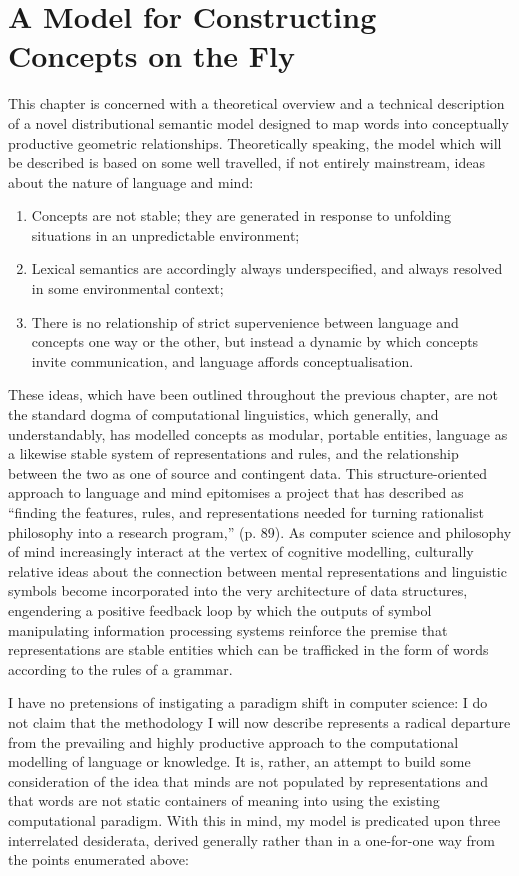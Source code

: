 \chapter{A Model for Constructing Concepts on the Fly} \label{chap:theory}
This chapter is concerned with a theoretical overview and a technical description of a novel distributional semantic model designed to map words into conceptually productive geometric relationships.  Theoretically speaking, the model which will be described is based on some well travelled, if not entirely mainstream, ideas about the nature of language and mind:

\begin{enumerate}
\item{Concepts are not stable; they are generated in response to unfolding situations in an unpredictable environment;}
\item{Lexical semantics are accordingly always underspecified, and always resolved in some environmental context;}
\item{There is no relationship of strict supervenience between language and concepts one way or the other, but instead a dynamic by which concepts invite communication, and language affords conceptualisation.}
\end{enumerate}

These ideas, which have been outlined throughout the previous chapter, are not the standard dogma of computational linguistics, which generally, and understandably, has modelled concepts as modular, portable entities, language as a likewise stable system of representations and rules, and the relationship between the two as one of source and contingent data.  This structure-oriented approach to language and mind epitomises a project that \cite{Dreyfus2012} has described as ``finding the features, rules, and representations needed for turning rationalist philosophy into a research program,'' (p. 89).  As computer science and philosophy of mind increasingly interact at the vertex of cognitive modelling, culturally relative ideas about the connection between mental representations and linguistic symbols become incorporated into the very architecture of data structures, engendering a positive feedback loop by which the outputs of symbol manipulating information processing systems reinforce the premise that representations are stable entities which can be trafficked in the form of words according to the rules of a grammar.

I have no pretensions of instigating a paradigm shift in computer science: I do not claim that the methodology I will now describe represents a radical departure from the prevailing and highly productive approach to the computational modelling of language or knowledge.  It is, rather, an attempt to build some consideration of the idea that minds are not populated by representations and that words are not static containers of meaning into using the existing computational paradigm.  With this in mind, my model is predicated upon three interrelated desiderata, derived generally rather than in a one-for-one way from the points enumerated above:

